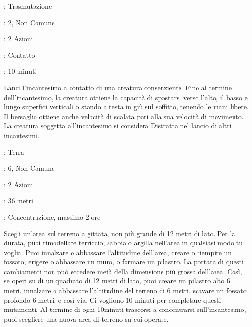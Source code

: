 \begin{multicols}{2}
\noindent\colorbox{OBSSgold!10}{
\begin{minipage}{0.95\linewidth}
\begin{description}[noitemsep, topsep=0pt, parsep=0pt, partopsep=0pt, leftmargin=0cm, labelwidth=1.3cm]
	\item[\textbf{Lista}]: Trasmutazione
	\item[\textbf{Livello}]: 2, Non Comune
	\item[\textbf{Lancio}]: 2 Azioni
	\item[\textbf{Gittata}]: Contatto
	\item[\textbf{Durata}]: 10 minuti
\end{description}
\end{minipage}}\smallskip

Lanci l'incantesimo a contatto di una creatura consenziente. Fino al termine dell'incantesimo, la creatura ottiene la capacità di spostarsi verso l'alto, il basso e lungo superfici verticali o stando a testa in giù sul soffitto, tenendo le mani libere. Il bersaglio ottiene anche velocità di scalata pari alla sua velocità di movimento. La creatura soggetta all'incantesimo si considera Distratta nel lancio di altri incantesimi.

\noindent\colorbox{OBSSgold!10}{
\begin{minipage}{0.95\linewidth}
\begin{description}[noitemsep, topsep=0pt, parsep=0pt, partopsep=0pt, leftmargin=0cm, labelwidth=1.3cm]
	\item[\textbf{Lista}]: Terra
	\item[\textbf{Livello}]: 6, Non Comune
	\item[\textbf{Lancio}]: 2 Azioni
	\item[\textbf{Gittata}]: 36 metri
	\item[\textbf{Durata}]: Concentrazione, massimo 2 ore
\end{description}
\end{minipage}}\smallskip

Scegli un'area sul terreno a gittata, non più grande di 12 metri di lato. Per la durata, puoi rimodellare terriccio, sabbia o argilla nell'area in qualsiasi modo tu voglia. Puoi innalzare o abbassare l'altitudine dell'area, creare o riempire un fossato, erigere o abbassare un muro, o formare un pilastro. La portata di questi cambiamenti non può eccedere metà della dimensione più grossa dell'area. Così, se operi su di un quadrato di 12 metri di lato, puoi creare un pilastro alto 6 metri, innalzare o abbassare l'altitudine del terreno di 6 metri, scavare un fossato profondo 6 metri, e così via. Ci vogliono 10 minuti per completare questi mutamenti. Al termine di ogni 10minuti trascorsi a concentrarsi sull'incantesimo, puoi scegliere una nuova area di terreno su cui operare.


\end{multicols}
